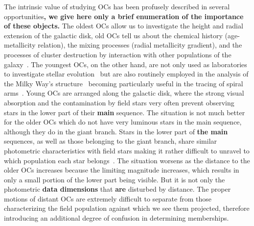 \documentclass[referee]{aa}
\begin{document}
 The intrinsic value of studying OCs has been profusely described in several
 opportunities\textbf{, we  give here only a brief enumeration of the importance
 of these objects.} The oldest OCs
 allow us to investigate the height and radial extension of the galactic disk,
 old OCs tell us about the chemical history (age-metallicity relation), the
 mixing processes (radial metallicity gradient), and the processes of cluster
 destruction by interaction with other populations of the
 galaxy~\citep{Friel1995,Tosi_2004,Lamers_2005}.
 The youngest OCs, on the other hand, are not only used as laboratories to
 investigate stellar evolution~\citep[they allow studying in detail the boundary
 conditions necessary to create new generations of stars, ][]{Lada2003} but are
 also routinely employed in the analysis of the Milky Way's
 structure~\citep{Loktin_1992,Moitinho_2006,Vazquez2008,Moitinho_2010}
 becoming particularly useful in the tracing of spiral
 arms~\citep{carraro_2013,Molina_2018}.
 Young OCs are arranged along the galactic disk, where the strong visual
 absorption and the contamination by field stars very often prevent observing
 stars in the lower part of their \textbf{main} sequence.
 The situation is not much better for the older OCs which do not
 have very luminous stars in the main sequence, although they do in the giant
 branch. Stars in the lower part of \textbf{the main} sequences, as well as those
 belonging to the giant branch, share similar photometric characteristics with
 field stars making it rather difficult to unravel to which population each star
 belongs~\citep{Hayes_2015}.
 The situation worsens as the distance to the older OCs increases because the
 limiting magnitude increases, which results in only a small portion of
 the lower part being visible. But it is not only the photometric
 \textbf{data dimensions} that \textbf{are} disturbed by distance. The proper
 motions of distant OCs are
 extremely difficult to separate from those characterizing the field
 population against which we see them projected, therefore introducing an
 additional degree of confusion in determining memberships.
\end{document}
